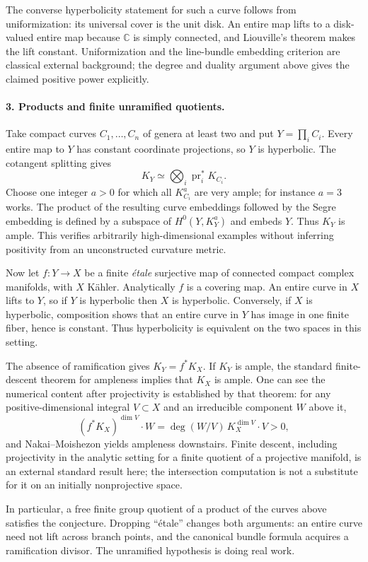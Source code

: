 \documentclass[11pt]{article}
\begin{document}
The converse hyperbolicity statement for such a curve follows from uniformization: its universal cover is the unit disk. An entire map lifts to a disk-valued entire map because $\mathbb C$ is simply connected, and Liouville's theorem makes the lift constant. Uniformization and the line-bundle embedding criterion are classical external background; the degree and duality argument above gives the claimed positive power explicitly.

\paragraph{3. Products and finite unramified quotients.}
Take compact curves $C_1,\ldots,C_n$ of genera at least two and put $Y=\prod_i C_i$. Every entire map to $Y$ has constant coordinate projections, so $Y$ is hyperbolic. The cotangent splitting gives
\[
 K_Y\simeq\bigotimes_i\operatorname{pr}_i^*K_{C_i}.      \tag{2}
\]
Choose one integer $a>0$ for which all $K_{C_i}^a$ are very ample; for instance $a=3$ works. The product of the resulting curve embeddings followed by the Segre embedding is defined by a subspace of $H^0(Y,K_Y^a)$ and embeds $Y$. Thus $K_Y$ is ample. This verifies arbitrarily high-dimensional examples without inferring positivity from an unconstructed curvature metric.

Now let $f:Y\to X$ be a finite \emph{\'etale} surjective map of connected compact complex manifolds, with $X$ K\"ahler. Analytically $f$ is a covering map. An entire curve in $X$ lifts to $Y$, so if $Y$ is hyperbolic then $X$ is hyperbolic. Conversely, if $X$ is hyperbolic, composition shows that an entire curve in $Y$ has image in one finite fiber, hence is constant. Thus hyperbolicity is equivalent on the two spaces in this setting.

The absence of ramification gives $K_Y=f^*K_X$. If $K_Y$ is ample, the standard finite-descent theorem for ampleness implies that $K_X$ is ample. One can see the numerical content after projectivity is established by that theorem: for any positive-dimensional integral $V\subset X$ and an irreducible component $W$ above it,
\[
 (f^*K_X)^{\dim V}\cdot W
   =\deg(W/V)\,K_X^{\dim V}\cdot V>0,
\]
and Nakai--Moishezon yields ampleness downstairs. Finite descent, including projectivity in the analytic setting for a finite quotient of a projective manifold, is an external standard result here; the intersection computation is not a substitute for it on an initially nonprojective space.

In particular, a free finite group quotient of a product of the curves above satisfies the conjecture. Dropping ``\'etale'' changes both arguments: an entire curve need not lift across branch points, and the canonical bundle formula acquires a ramification divisor. The unramified hypothesis is doing real work.
\end{document}
